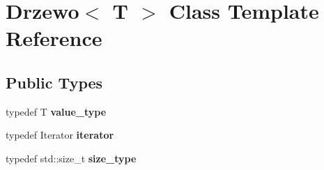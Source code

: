 \hypertarget{class_drzewo}{}\section{Drzewo$<$ T $>$ Class Template Reference}
\label{class_drzewo}
\subsection*{Public Types}
\begin{DoxyCompactItemize}
\item 
\mbox{\label{class_drzewo_a349719391d8470c24d68e8a4f0fecf3c}} 
typedef T {\bfseries value\+\_\+type}
\item 
\mbox{\label{class_drzewo_a030e94f1940858d588debb37c16327bd}} 
typedef Iterator {\bfseries iterator}
\item 
\mbox{\label{class_drzewo_a6a773d36cb8f4997a95cfb2d6f56bb9a}} 
typedef std\+::size\+\_\+t {\bfseries size\+\_\+type}
\end{DoxyCompactItemize}
